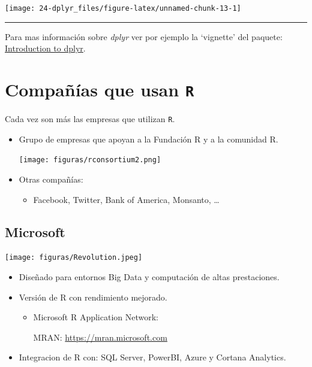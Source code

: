 \documentclass[
]{book}
\providecommand{\tightlist}{%
  \setlength{\itemsep}{0pt}\setlength{\parskip}{0pt}}
\theoremstyle{break}
\begin{document}
\begin{center}\texttt{[image: 24-dplyr\_files/figure-latex/unnamed-chunk-13-1]} \end{center}

\begin{center}\rule{0.5\linewidth}{0.5pt}\end{center}

Para mas información sobre \emph{dplyr} ver por ejemplo la `vignette' del paquete:\\
\href{http://cran.rstudio.com/web/packages/dplyr/vignettes/introduction.html}{Introduction to dplyr}.

\hypertarget{compauxf1uxedas-que-usan-r}{%
\chapter{\texorpdfstring{Compañías que usan \texttt{R}}{Compañías que usan R}}\label{compauxf1uxedas-que-usan-r}}

Cada vez son más las empresas que utilizan \texttt{R}.

\begin{itemize}
\item
  Grupo de empresas que apoyan a la Fundación R y a la comunidad R.

  \texttt{[image: figuras/rconsortium2.png]}
\item
  Otras compañías:

  \begin{itemize}
  \tightlist
  \item
    Facebook, Twitter, Bank of America, Monsanto, \ldots{}
  \end{itemize}
\end{itemize}

\hypertarget{microsoft}{%
\section{Microsoft}\label{microsoft}}

\texttt{[image: figuras/Revolution.jpeg]}

\begin{itemize}
\item
  Diseñado para entornos Big Data y computación de altas prestaciones.
\item
  Versión de R con rendimiento mejorado.

  \begin{itemize}
  \item
    Microsoft R Application Network:

    MRAN: \url{https://mran.microsoft.com}
  \end{itemize}
\item
  Integracion de R con: SQL Server, PowerBI, Azure y Cortana
  Analytics.
\end{itemize}
\end{document}
